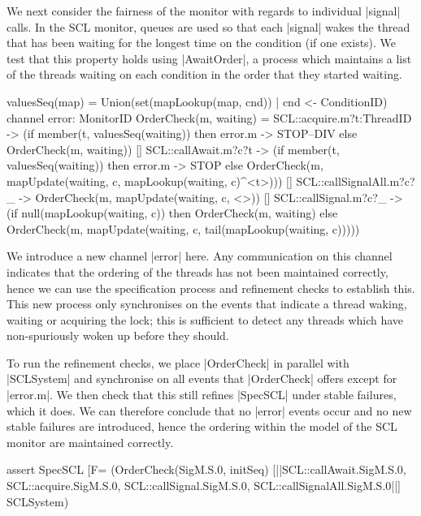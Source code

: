 We next consider the fairness of the monitor with regards to individual |signal| calls. In the SCL monitor, queues are used so that each |signal| wakes the thread that has been waiting for the longest time on the condition (if one exists). We test that this property holds using |AwaitOrder|, a process which maintains a list of the threads waiting on each condition in the order that they started waiting.

\begin{cspm}
valuesSeq(map) = Union({set(mapLookup(map, cnd)) | cnd <- ConditionID})
channel error: MonitorID
OrderCheck(m, waiting) = 
      SCL::acquire.m?t:ThreadID -> 
      (if member(t, valuesSeq(waiting)) then error.m -> STOP--DIV
        else OrderCheck(m, waiting))
  [] SCL::callAwait.m?c?t -> 
      (if member(t, valuesSeq(waiting)) then error.m -> STOP
        else OrderCheck(m, mapUpdate(waiting, c, mapLookup(waiting, c)^<t>)))
  [] SCL::callSignalAll.m?c?_ -> 
        OrderCheck(m, mapUpdate(waiting, c, <>))
  [] SCL::callSignal.m?c?_ -> 
      (if null(mapLookup(waiting, c)) then OrderCheck(m, waiting)
        else OrderCheck(m, mapUpdate(waiting, c, 
                                    tail(mapLookup(waiting, c)))))
\end{cspm}

We introduce a new channel |error| here. Any communication on this channel indicates that the ordering of the threads has not been maintained correctly, hence we can use the specification process and refinement checks to establish this. This new process only synchronises on the events that indicate a thread waking, waiting or acquiring the lock; this is sufficient to detect any threads which have non-spuriously woken up before they should.

To run the refinement checks, we place |OrderCheck| in parallel with |SCLSystem| and synchronise on all events that |OrderCheck| offers except for |error.m|. We then check that this still refines |SpecSCL| under stable failures, which it does. We can therefore conclude that no |error| events occur and no new stable failures are introduced, hence the ordering within the model of the SCL monitor are maintained correctly.

\begin{cspm}
assert SpecSCL [F= (OrderCheck(SigM.S.0, initSeq) 
                     [|{|SCL::callAwait.SigM.S.0,
                         SCL::acquire.SigM.S.0,
                         SCL::callSignal.SigM.S.0,
                         SCL::callSignalAll.SigM.S.0|}|] SCLSystem)
\end{cspm}

